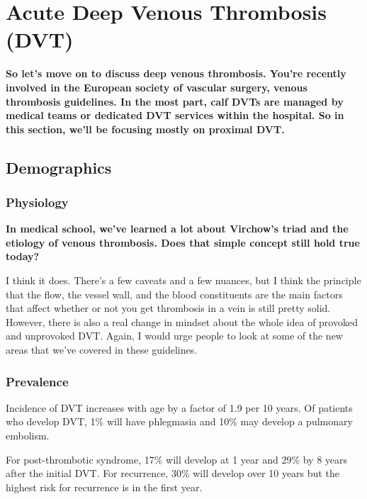\documentclass[
]{book}
\begin{document}
\hypertarget{acute-deep-venous-thrombosis-dvt}{%
\section{Acute Deep Venous Thrombosis (DVT)}\label{acute-deep-venous-thrombosis-dvt}}

\textbf{So let's move on to discuss deep venous thrombosis. You're recently
involved in the European society of vascular surgery, venous thrombosis
guidelines. In the most part, calf DVTs are managed by medical teams or
dedicated DVT services within the hospital. So in this section, we'll be
focusing mostly on proximal DVT.}

\hypertarget{demographics-5}{%
\subsection{Demographics}\label{demographics-5}}

\hypertarget{physiology}{%
\subsubsection{Physiology}\label{physiology}}

\textbf{In medical school, we've learned a lot about Virchow's triad and the
etiology of venous thrombosis. Does that simple concept still hold true
today?}

I think it does. There's a few caveats and a few nuances, but I think
the principle that the flow, the vessel wall, and the blood constituents
are the main factors that affect whether or not you get thrombosis in a
vein is still pretty solid. However, there is also a real change in
mindset about the whole idea of provoked and unprovoked DVT. Again, I
would urge people to look at some of the new areas that we've covered in
these guidelines.

\hypertarget{prevalence}{%
\subsubsection{Prevalence}\label{prevalence}}

Incidence of DVT increases with age by a factor of 1.9 per 10 years. Of
patients who develop DVT, 1\% will have phlegmasia and 10\% may develop a
pulmonary embolism.

For post-thrombotic syndrome, 17\% will develop at 1 year and 29\% by 8
years after the initial DVT. For recurrence, 30\% will develop over 10
years but the highest risk for recurrence is in the first
year.\citep{beckman2010, bulger2004, meissner2007}
\end{document}

